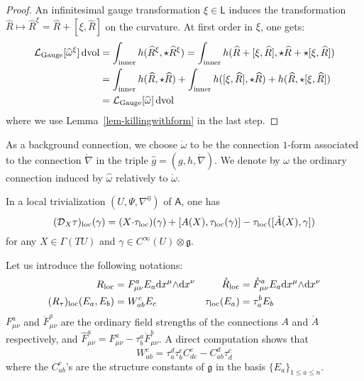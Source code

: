 \documentclass[number]{elsarticle}
\theoremstyle{definition}
\theoremstyle{remark}
\numberwithin{equation}{section}
\begin{document}
\begin{proof}
An infinitesimal gauge transformation $\xi \in {{{{\mathbf{\mathsf{{L}}}}}}}$ induces the transformation ${\widehat{R}} \mapsto {\widehat{R}}^\xi = {\widehat{R}} + [\xi,{\widehat{R}}]$ on the curvature. At first order in $\xi$, one gets:
\begin{align*}
{{{{\mathcal{{L}}}}}}_\text{Gauge}[{\widehat{\omega}}^\xi]\, {\textnormal{dvol}} &= \int_{{\text{\textup{inner}}}} h({\widehat{R}}^\xi,{\mathop{\star}} {\widehat{R}}^\xi) = \int_{{\text{\textup{inner}}}} h({\widehat{R}} + [\xi,{\widehat{R}}],{\mathop{\star}} {\widehat{R}} + {\mathop{\star}}[\xi,{\widehat{R}}])
\\
&= \int_{{\text{\textup{inner}}}} h({\widehat{R}},{\mathop{\star}} {\widehat{R}}) + \int_{{\text{\textup{inner}}}} h([\xi,{\widehat{R}}],{\mathop{\star}} {\widehat{R}}) + h({\widehat{R}},{\mathop{\star}}[\xi,{\widehat{R}}])
\\
&= {{{{\mathcal{{L}}}}}}_\text{Gauge}[{\widehat{\omega}}]\, {\textnormal{dvol}}
\end{align*}
where we use Lemma~\ref{lem-killingwithform} in the last step.
\end{proof}

As a background connection, we choose ${{\mathring{{\omega}}}}$ to be the connection $1$-form associated to the connection ${{\mathring{{\nabla}}}}$ in the triple ${{\widehat{g}}} = (g,h,{{\mathring{{\nabla}}}})$. We denote by $\omega$ the ordinary connection induced by ${\widehat{\omega}}$ relatively to ${{\mathring{{\omega}}}}$. 

In a local trivialization $(U,\Psi,\nabla^0)$ of ${{{{\mathbf{\mathsf{{A}}}}}}}$, one has
\begin{equation*}
({{\mathcal D}}_X {\tau})_{{\text{\textup{loc}}}}(\gamma) = (X {\mathord{\cdot}} {\tau}_{{\text{\textup{loc}}}})(\gamma) + [A(X), {\tau}_{{\text{\textup{loc}}}}(\gamma)] - {\tau}_{{\text{\textup{loc}}}}([{{\mathring{{A}}}}(X), \gamma])
\end{equation*}
for any $X \in \Gamma(TU)$ and $\gamma \in C^\infty(U) \otimes {{\mathfrak g}}$.

Let us introduce the following notations:
\begin{align*}
R_{{\text{\textup{loc}}}} &= F_{\mu \nu}^a E_a {\text{\textup{d}}} x^\mu {\mathord{\wedge}} {\text{\textup{d}}} x^\nu 
&
{{\mathring{{R}}}}_{{\text{\textup{loc}}}} &= {{\mathring{{F}}}}_{\mu \nu}^a E_a {\text{\textup{d}}} x^\mu {\mathord{\wedge}} {\text{\textup{d}}} x^\nu 
\\
(R_{\tau})_{{\text{\textup{loc}}}} (E_a, E_b) &= W_{ab}^c E_c
&
{\tau}_{{\text{\textup{loc}}}}(E_a) &= {\tau}^b_a E_b
\end{align*}
$F_{\mu \nu}^a$ and ${{\mathring{{F}}}}_{\mu \nu}^a$ are the ordinary field strengths of the connections $A$ and ${{\mathring{{A}}}}$ respectively, and ${{\widehat{F}}}_{\mu \nu}^a = F_{\mu \nu}^a - {\tau}^a_b {{\mathring{{F}}}}_{\mu \nu}^b$. A direct computation shows that
\begin{equation*}
W_{ab}^c = {\tau}_a^d{\tau}_b^e C_{de}^c - C_{ab}^d {\tau}_d^c
\end{equation*}
where the $C_{ab}^c$'s are the structure constants of ${{\mathfrak g}}$ in the basis $\{ E_a \}_{1 \leq a \leq n}$. 
\end{document}

